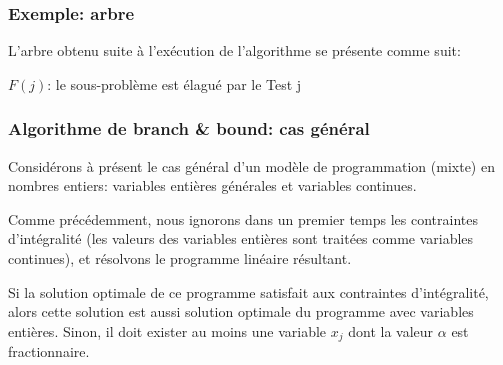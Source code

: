 \documentclass[usepdftitle=false]{beamer}
\begin{document}
\begin{frame}
\frametitle{Exemple: arbre}

L'arbre obtenu suite à l'exécution de l'algorithme se présente comme suit:
\begin{center}
\end{center}
$F(j)$: le sous-problème est élagué par le Test j

\end{frame}

\begin{frame}
\frametitle{Algorithme de branch \& bound: cas général}

Considérons à présent le cas général d'un modèle de programmation (mixte) en nombres entiers: variables entières générales et variables continues.

\mbox{}

Comme précédemment, nous ignorons dans un premier temps les contraintes d'intégralité (les valeurs des variables entières sont traitées comme variables continues), et résolvons le programme linéaire résultant.

\mbox{}

Si la solution optimale de ce programme satisfait aux contraintes d'intégralité, alors cette solution est aussi solution optimale du programme avec variables entières.
Sinon, il doit exister au moins une variable $x_j$ dont la valeur $\alpha$ est fractionnaire.

\end{frame}
\end{document}
